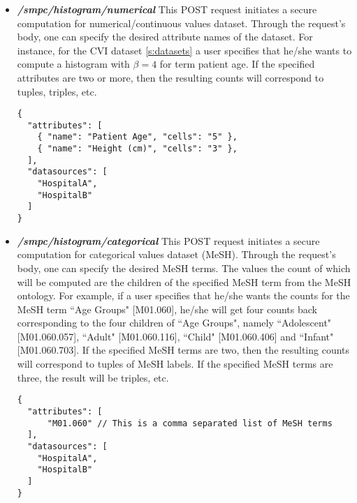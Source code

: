 \begin{itemize}
\item \textbf{\textit{/smpc/histogram/numerical}}
This POST request initiates a secure computation for numerical/continuous values dataset.
Through the request's body, one can specify the desired attribute names of the dataset.
For instance, for the CVI dataset \ref{s:datasets} a user specifies that he/she wants to compute a histogram with $\beta = 4$ for term patient age.
If the specified attributes are two or more, then the resulting counts will correspond to tuples, triples, etc.

{
\begin{verbatim}
{
  "attributes": [
    { "name": "Patient Age", "cells": "5" },
    { "name": "Height (cm)", "cells": "3" },
  ],
  "datasources": [
    "HospitalA",
    "HospitalB"
  ]
}
\end{verbatim}
\label{sc:histogram-numerical-post}
}



\item \textbf{\textit{/smpc/histogram/categorical}}
This POST request initiates a secure computation for categorical values dataset (MeSH).
Through the request's body, one can specify the desired MeSH terms.
The values the count of which will be computed are the children of the specified MeSH term from the MeSH ontology.
For example, if a user specifies that he/she wants the counts for the MeSH term ``Age Groups" [M01.060], he/she will get four counts back corresponding to the four children of ``Age Groups", namely ``Adolescent" [M01.060.057], ``Adult" [M01.060.116], ``Child" [M01.060.406] and ``Infant" [M01.060.703].
If the specified MeSH terms are two, then the resulting counts will correspond to tuples of MeSH labels.
If the specified MeSH terms are three, the result will be triples, etc.

{
\begin{verbatim}
{
  "attributes": [
      "M01.060" // This is a comma separated list of MeSH terms
  ],
  "datasources": [
    "HospitalA",
    "HospitalB"
  ]
}
\end{verbatim}
\label{sc:histogram-categorical-post}
}




\end{itemize}
